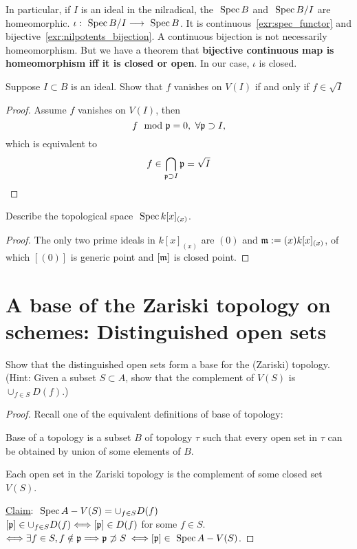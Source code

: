 \begin{remark}
In particular, if $I$ is an ideal in the nilradical, the $\text{ Spec\,} B$ and $\text{ Spec\,} B/I$ are homeomorphic. $\iota:\text{ Spec\,} B/I\longrightarrow \text{ Spec\,} B$. It is continuous~\ref{exr:spec_functor} and bijective~\ref{exr:nilpotents_bijection}.
A continuous bijection is not necessarily homeomorphism. But we have a theorem that \textbf{bijective continuous map is homeomorphism iff it is closed or open}. In our case, $\iota$ is closed. 
\end{remark}
\begin{exr}\label{exr:vanishing_set_radical}
Suppose $ I \subset B$ is an ideal. Show that $f$ vanishes on $V(I)$ if and only if $f \in \sqrt I$
\end{exr}
\begin{proof}
Assume $f$ vanishes on $V(I)$, then
$$
f\mod {{\mathfrak p}}=0,\ \forall  {\mathfrak p}\supset I,
$$
which is equivalent to 
$$
f\in \bigcap_{{\mathfrak p}\supset I}{\mathfrak p}=\sqrt{I}
$$

\end{proof}

\begin{exr}
Describe the topological space $\text{ Spec\,} k[x]_{(x)}$.
\end{exr}
\begin{proof}
The only two prime ideals in $k[x]_{(x)}$ are $(0)$ and ${\mathfrak m}:=(x)k[x]_{(x)}$, of which $[(0)]$ is generic point and $[{\mathfrak m}]$ is closed point.
\end{proof}


\section{A base of the Zariski topology on schemes: Distinguished open sets}
\begin{exr}
Show that the distinguished open sets form a base for the (Zariski) topology. (Hint: Given a subset $ S \subset A$, show that the complement of $V(S)$ is $\cup_{f\in S}D(f).$)
\end{exr}
\begin{proof}
Recall one of the equivalent definitions of base of topology:

Base of a topology is a subset $B$ of topology $\tau$ such that every open set in $\tau$ can be obtained by union of some elements of $B$.

Each open set in the Zariski topology is the complement of some closed set $V(S)$.

\underline{Claim}: $\text{ Spec\,} A-V(S)=\cup_{f\in S} D(f)$\\
$[{\mathfrak p}]\in \cup_{f\in S} D(f)\Longleftrightarrow [{\mathfrak p}]\in D(f)$ for some $f\in S$.\\
$ \Longleftrightarrow\exists f\in S, f\notin {\mathfrak p}\Longrightarrow {\mathfrak p}\not \supset S$ $\Longleftrightarrow [{\mathfrak p}]\in\text{ Spec\,} A-V(S)$.
\end{proof}

